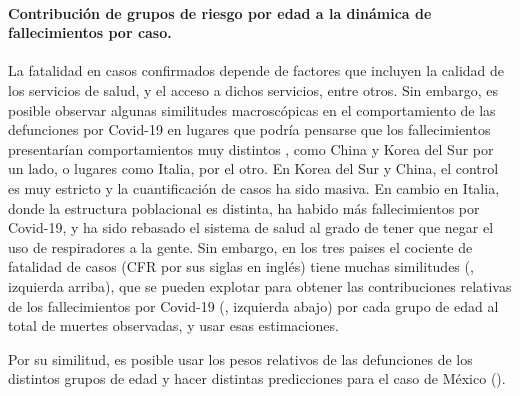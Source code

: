 \bigskip
\paragraph{Contribución de grupos de riesgo por edad a la dinámica de fallecimientos por caso.}
La fatalidad en casos confirmados depende de factores que incluyen la calidad de los servicios de salud, y el acceso a dichos servicios, entre otros. 
Sin embargo, es posible observar algunas similitudes macroscópicas en el comportamiento de las defunciones por Covid-19 en lugares que podría pensarse que los fallecimientos presentarían comportamientos muy distintos , como China y Korea del Sur por un lado, o lugares como Italia, por el otro. 
En Korea del Sur y China, el control es muy estricto y la cuantificación de casos ha sido masiva. 
En cambio en Italia, donde la estructura poblacional es distinta, ha habido más fallecimientos por Covid-19, y ha sido rebasado el sistema de salud al grado de tener que negar el uso de respiradores a la gente. 
Sin embargo, en los tres paises el cociente de fatalidad de casos (CFR por sus siglas en inglés) tiene muchas similitudes (, izquierda arriba), que se pueden explotar para obtener las contribuciones relativas de los fallecimientos por Covid-19 (, izquierda abajo) por cada grupo de edad al total de muertes observadas, y usar esas estimaciones. 

Por su similitud, es posible usar los pesos relativos de las defunciones de los distintos grupos de edad y  hacer distintas predicciones para el caso de México ().


